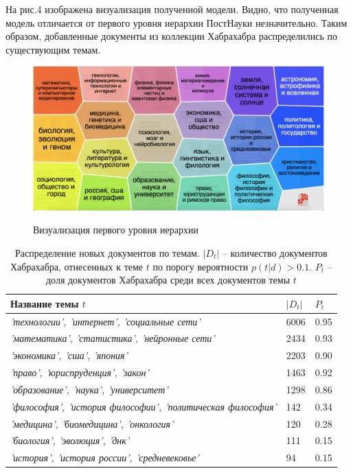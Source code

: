 На рис.4 изображена визуализация полученной модели. Видно, что полученная модель отличается от первого уровня иерархии
ПостНауки незначительно. Таким образом, добавленные документы из коллекции Хабрахабра распределились по существующим темам.

\begin{figure}[h]
    \centering 
    \includegraphics[width=1\textwidth]{img/pn_level0.png} \\
 \caption{Визуализация первого уровня иерархии}
    \end{figure}
    
\begin{table}[h]
\centering
\begin{tabular}[t]{p{22em}|p{2em}|p{2em}}
 Название темы $t$ & $|D_t|$ & $P_t$\\
\hline
\textit{'технологии', 'интернет', 'социальные сети'} & 6006& 0.95 \\
\hline
\textit{'математика', 'статистика', 'нейронные сети'} & 2434 & 0.93 \\
\hline
\textit{'экономика', 'сша', 'япония'} & 2203& 0.90  \\
\hline
\textit{'право', 'юриспруденция', 'закон'} & 1463&  0.92  \\
\hline
\textit{'образование', 'наука', 'университет'} & 1298& 0.86  \\
\hline
\textit{'философия', 'история философии', 'политическая философия'} & 142& 0.34  \\
\hline
\textit{'медицина', 'биомедицина', 'онкология'} &120& 0.28 \\
\hline
\textit{'биология', 'эволюция', 'днк'} & 111 & 0.15  \\
\hline
\textit{'история', 'история россии', 'средневековье'} & 94& 0.15  \\

\end{tabular}
\caption{\label{table:p_habr}Распределение новых документов по темам. $|D_t|$ -- количество документов Хабрахабра, отнесенных к теме $t$ по порогу вероятности $p(t|d) > 0.1$. $P_t$ -- доля документов Хабрахабра среди всех документов темы $t$}
\end{table}

